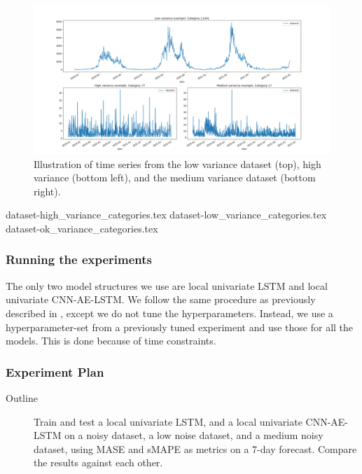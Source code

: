 \begin{figure}[h!]
  \centering
  \includegraphics[width=\textwidth]{./figs/code_generated/time-series-variance-examples.png}
  \hfill
  \caption{Illustration of time series from the low variance dataset (top), high variance (bottom left), and the medium variance dataset (bottom right).}
  \label{fig:time-series-variance-examples}
\end{figure}

{dataset-high_variance_categories.tex}
{dataset-low_variance_categories.tex}
{dataset-ok_variance_categories.tex}

\subsubsection{Running the experiments}
The only two model structures we use are local univariate LSTM
and local univariate CNN-AE-LSTM.
We follow the same procedure as previously described in ,
except we do not tune the hyperparameters. Instead, we
use a hyperparameter-set from a previously tuned experiment and use those for all the models.
This is done because of time constraints.

\subsubsection{Experiment Plan}
\begin{description}
  \item[Outline]{
              Train and test a local univariate LSTM,
              and a local univariate CNN-AE-LSTM on a noisy dataset, a low noise dataset, and a medium noisy dataset,
              using MASE and sMAPE as metrics on a 7-day forecast.
              Compare the results against each other.
        }
\end{description}

